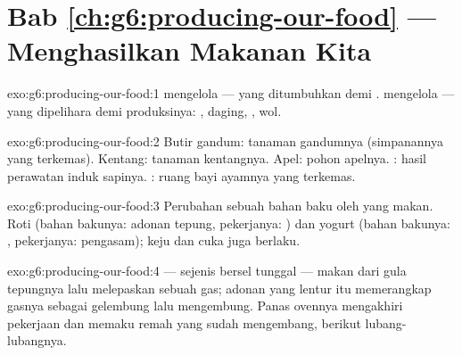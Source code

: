 \section*{Bab \ref{ch:g6:producing-our-food} --- Menghasilkan Makanan Kita}

\begin{solution}{exo:g6:producing-our-food:1}
 mengelola  ---  yang ditumbuhkan demi
.  mengelola  --- 
yang dipelihara demi produksinya: , daging, , wol.
\end{solution}

\begin{solution}{exo:g6:producing-our-food:2}
Butir gandum:  tanaman gandumnya (simpanannya yang terkemas).
Kentang:  tanaman kentangnya. Apel:  pohon apelnya.
: hasil perawatan induk sapinya. : ruang bayi ayamnya yang
terkemas.
\end{solution}

\begin{solution}{exo:g6:producing-our-food:3}
Perubahan sebuah bahan baku oleh  yang makan. Roti (bahan
bakunya: adonan tepung, pekerjanya: ) dan yogurt (bahan bakunya:
, pekerjanya:  pengasam); keju dan cuka juga berlaku.
\end{solution}

\begin{solution}{exo:g6:producing-our-food:4}
 --- sejenis  bersel tunggal --- makan dari gula tepungnya
lalu melepaskan sebuah gas; adonan yang lentur itu memerangkap gasnya
sebagai gelembung lalu mengembung. Panas ovennya mengakhiri pekerjaan
 dan memaku remah yang sudah mengembang, berikut lubang-lubangnya.
\end{solution}


